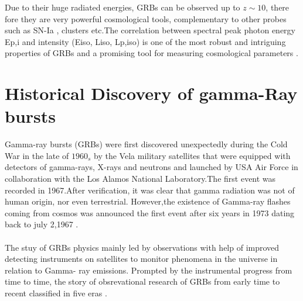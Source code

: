 Due to their huge radiated energies, GRBs can be observed up to $z  \sim 10$, there 
fore they are very powerful cosmological tools, complementary to other probes
such as SN-Ia , clusters etc.The correlation between spectral peak photon
energy Ep,i and intensity (Eiso, Liso, Lp,iso) is one of the most robust and intriguing properties of GRBs and a promising tool for measuring cosmological parameters \citep{2, 3}.
\section{Historical Discovery of gamma-Ray bursts }
Gamma-ray bursts (GRBs) were first discovered unexpectedly during the Cold War
in the late of $1960_{s}$  by the Vela military satellites that  were equipped with detectors of gamma-rays, X-rays and neutrons and launched by USA Air Force in collaboration with the Los Alamos National Laboratory.The first event was recorded in 1967.After verification, it was clear that gamma radiation was not of human origin, nor even terrestrial. However,the existence of Gamma-ray flashes coming from cosmos was  announced the first event after six years in 1973 dating back to july 2,1967       \citep{4}.\\\\ 
The stuy of GRBs physics mainly led by observations with help of improved detecting instruments on satellites to monitor phenomena in the universe in relation to  Gamma- ray emissions.  Prompted by the instrumental progress from time to time, the story of obsrevational research of GRBs from early time to recent  classified in five eras  \citep{4} \citep { 5}.\\\\
